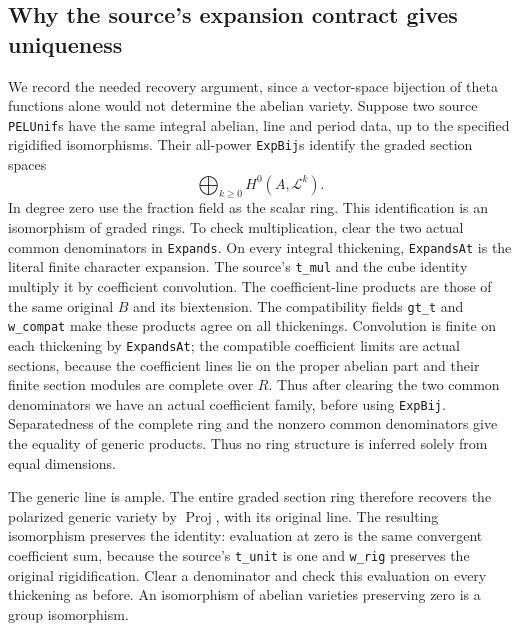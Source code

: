 \subsection*{Why the source's expansion contract gives uniqueness}

We record the needed recovery argument, since a vector-space
bijection of theta functions alone would not determine the
abelian variety.  Suppose two source \texttt{PELUnif}s have
the same integral abelian, line and period data, up to the
specified rigidified isomorphisms.  Their all-power
\texttt{ExpBij}s identify the graded section spaces
\[
                     \bigoplus_{k\geq0}H^0(A,\mathscr L^k).
\]
In degree zero use the fraction field as the scalar ring.
This identification is an isomorphism of graded rings.
To check multiplication, clear the two actual common
denominators in \texttt{Expands}.  On every integral thickening,
\texttt{ExpandsAt} is the literal finite character expansion.
The source's \texttt{t\_mul} and the cube identity multiply it
by coefficient convolution.  The coefficient-line products
are those of the same original $B$ and its biextension.
The compatibility fields \texttt{gt\_t} and
\texttt{w\_compat} make these products agree on all thickenings.
Convolution is finite on each thickening by \texttt{ExpandsAt};
the compatible coefficient limits are actual sections, because
the coefficient lines lie on the proper abelian part and their
finite section modules are complete over $R$.
Thus after clearing the two common denominators we have an
actual coefficient family, before using \texttt{ExpBij}.
Separatedness of the complete ring and the nonzero common
denominators give the equality of generic products.  Thus no
ring structure is inferred solely from equal dimensions.

The generic line is ample.  The entire graded section ring
therefore recovers the polarized generic variety by
$\operatorname{Proj}$, with its original line.
The resulting isomorphism preserves the identity: evaluation
at zero is the same convergent coefficient sum, because the
source's \texttt{t\_unit} is one and \texttt{w\_rig}
preserves the original rigidification.  Clear a denominator
and check this evaluation on every thickening as before.
An isomorphism of abelian varieties preserving zero is a group
isomorphism.

